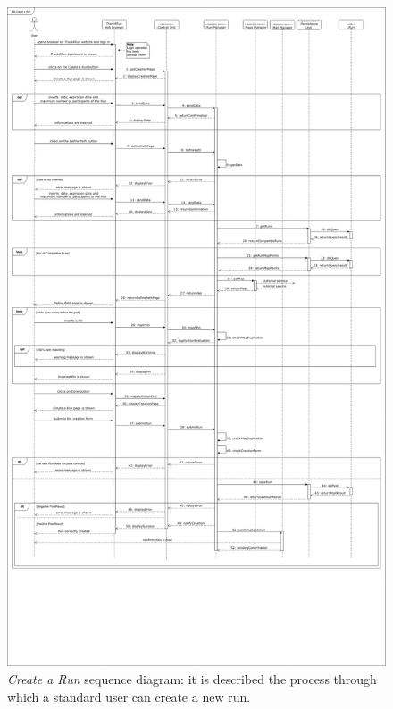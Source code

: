 \begin{figure}[H]
  \begin{center}
  	\includegraphics[width=\textwidth]{./img/sequence/createRun.png}
    \hspace{0.05\linewidth}
    \centering
    \caption{\textit{Create a Run} sequence diagram: it is described the process through which a standard user can create a new run.}
		\label{img:createRun}
    \end{center}
\end{figure}

